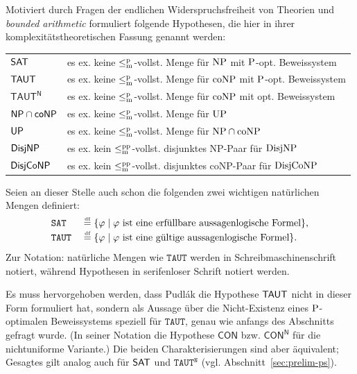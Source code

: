 Motiviert durch Fragen der endlichen Widerspruchsfreiheit von Theorien und \emph{bounded arithmetic} formuliert \textcite{pudlak_incompleteness_2017} folgende Hypothesen, die hier in ihrer komplexitätstheoretischen Fassung genannt werden:\par
\medskip
\begin{tabular}{l@{\quad:\quad}l}
    $\hSAT$ & es ex. keine $\leqmp$-vollst. Menge für $\NP$ mit $\P$-opt. Beweissystem\\
    $\hTAUT$ & es ex. keine $\leqmp$-vollst. Menge für $\coNP$ mit $\P$-opt. Beweissystem\\
    $\mathsf{TAUT^N}$ & es ex. keine $\leqmp$-vollst. Menge für $\coNP$ mit opt. Beweissystem\\
    $\hNPcoNP$ & es ex. keine $\leqmp$-vollst. Menge für $\UP$\\
    $\hUP$ & es ex. keine $\leqmp$-vollst. Menge für $\NP\cap\coNP$\\
    $\hDisjNP$ & es ex. kein $\leqmpp$-vollst. disjunktes NP-Paar für $\DisjNP$\\
    $\hDisjCoNP$ & es ex. kein $\leqmpp$-vollst. disjunktes coNP-Paar für $\DisjCoNP$
\end{tabular}\par
\medskip\noindent
Seien an dieser Stelle auch schon die folgenden zwei wichtigen natürlichen Mengen definiert:
\begin{alignat*}{2}
    &\mathtt{SAT} &&\defeq \{ \phi \mid \text{$\phi$ ist eine erfüllbare aussagenlogische Formel} \},\\
    &\mathtt{TAUT} &&\defeq \{ \phi \mid \text{$\phi$ ist eine gültige aussagenlogische Formel} \}.
\end{alignat*}
Zur Notation: natürliche Mengen wie $\mathtt{TAUT}$ werden in Schreibmaschinenschrift notiert, während Hypothesen in serifenloser Schrift notiert werden.

Es muss hervorgehoben werden, dass Pudlák die Hypothese $\hTAUT$ nicht in dieser Form formuliert hat, sondern als Aussage über die Nicht-Existenz eines $\P$-optimalen Beweissystems speziell für $\mathtt{TAUT}$, genau wie anfangs des Abschnitts gefragt wurde. (In seiner Notation die Hypothese $\mathsf{CON}$ bzw. $\mathsf{CON^N}$ für die nichtuniforme Variante.) Die beiden Charakterisierungen sind aber äquivalent; Gesagtes gilt analog auch für $\hSAT$ und $\mathtt{TAUT^N}$ (vgl. Abschnitt~\ref{sec:prelim-ps}).


